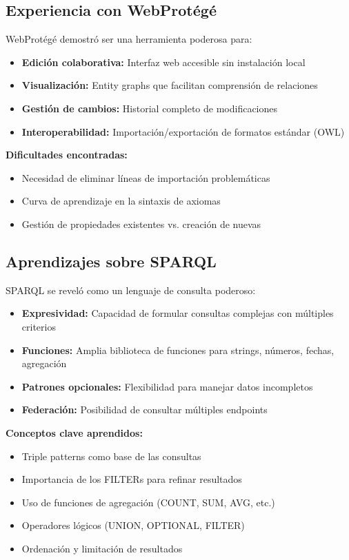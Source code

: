 \documentclass[12pt,a4paper]{article}
\begin{document}
\subsection{Experiencia con WebProtégé}

WebProtégé demostró ser una herramienta poderosa para:

\begin{itemize}
    \item \textbf{Edición colaborativa:} Interfaz web accesible sin instalación local
    \item \textbf{Visualización:} Entity graphs que facilitan comprensión de relaciones
    \item \textbf{Gestión de cambios:} Historial completo de modificaciones
    \item \textbf{Interoperabilidad:} Importación/exportación de formatos estándar (OWL)
\end{itemize}

\textbf{Dificultades encontradas:}
\begin{itemize}
    \item Necesidad de eliminar líneas de importación problemáticas
    \item Curva de aprendizaje en la sintaxis de axiomas
    \item Gestión de propiedades existentes vs. creación de nuevas
\end{itemize}

\subsection{Aprendizajes sobre SPARQL}

SPARQL se reveló como un lenguaje de consulta poderoso:

\begin{itemize}
    \item \textbf{Expresividad:} Capacidad de formular consultas complejas con múltiples criterios
    \item \textbf{Funciones:} Amplia biblioteca de funciones para strings, números, fechas, agregación
    \item \textbf{Patrones opcionales:} Flexibilidad para manejar datos incompletos
    \item \textbf{Federación:} Posibilidad de consultar múltiples endpoints
\end{itemize}

\textbf{Conceptos clave aprendidos:}
\begin{itemize}
    \item Triple patterns como base de las consultas
    \item Importancia de los FILTERs para refinar resultados
    \item Uso de funciones de agregación (COUNT, SUM, AVG, etc.)
    \item Operadores lógicos (UNION, OPTIONAL, FILTER)
    \item Ordenación y limitación de resultados
\end{itemize}
\end{document}
